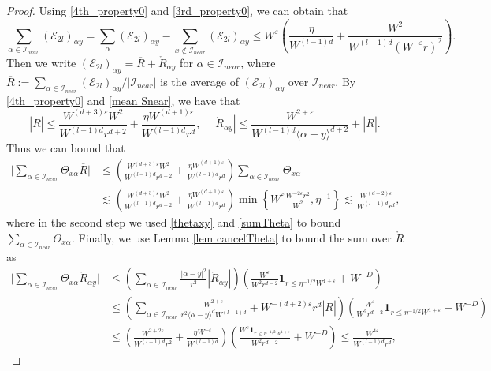 \documentclass{article}
\newcommand{\1}{\mathds{1}}
\numberwithin{equation}{section}
\newcommand{\al}{\alpha}
\newcommand{\be}{\begin{equation}}
\newcommand{\ee}{\end{equation}}
\newcommand{\e}{{\varepsilon}}
\renewcommand{\cal}{\mathcal}
\newcommand{\wt}{\widetilde}
\renewcommand{\leq}{\leqslant}
\renewcommand{\le}{\leq}
\theoremstyle{plain} %
\theoremstyle{remark}
\newcommand{\Selek}{{\mathcal E}}
\begin{document}
\begin{proof}
Using \eqref{4th_property0} and \eqref{3rd_property0}, we can obtain that 
\be\label{mean Snear}\sum_{\al\in \cal I_{near}} (\Selek_{2l})_{\al y}=\sum_\al (\Selek_{2l})_{\al y} - \sum_{x\notin \cal I_{near}} (\Selek_{2l})_{\al y} \le W^\e\left(\frac{\eta}{ W^{(l-1)d} } + \frac{W^2}{W^{(l-1)d} (W^{-\e}r)^{2}}\right).\ee
Then we write $ (\Selek_{2l})_{\al y} = \overline R + \mathring R_{\al y}$ for $\al \in \cal I_{near}$, where $\overline R:= \sum_{\al\in \cal I_{near}}(\Selek_{2l})_{\al y}/|\cal I_{near}|$ is the average of $(\Selek_{2l})_{\al y}$ over $\cal I_{near}$.   
By \eqref{4th_property0} and \eqref{mean Snear}, we have that
\be\label{bound barR} |\overline R| \le \frac{W^{(d+3)\e}W^2}{W^{(l-1)d}r^{d+2}}+\frac{ \eta W^{(d+1)\e}}{W^{(l-1)d}r^d},\quad | \mathring R_{\al y} | \le  \frac{W^{2+\e}}{W^{ (l-1)d}\langle \al-y\rangle^{d+2}} + |\overline R| .\ee
Thus we can bound that 
\begin{align}
\Big| \sum_{\al \in \cal I_{near}}\Theta_{  x \al} \overline R  \Big|&\le \left( \frac{W^{(d+3)\e}W^2}{W^{(l-1)d}r^{d+2}}+\frac{ \eta W^{(d+1)\e}}{W^{(l-1)d}r^d}\right)\sum_{\al\in \cal I_{near}}\Theta_{x\al} \nonumber\\
&\lesssim   \left( \frac{W^{(d+3)\e}W^2}{W^{(l-1)d}r^{d+2}}+\frac{ \eta W^{(d+1)\e}}{W^{(l-1)d}r^d}\right) \min\left\{W^\e\frac{W^{-2\e}r^2}{W^2},\eta^{-1}\right\} \lesssim  \frac{W^{(d+2)\e}}{W^{(l-1)d} r^{d}},\label{Rnear_sum1}
\end{align}
where in the second step we used \eqref{thetaxy} and \eqref{sumTheta} to bound $\sum_{\al\in \cal I_{near}}\Theta_{x\al} .$
Finally, we use Lemma \ref{lem cancelTheta} to bound the sum over $\mathring R$ as %
\begin{align}
\Big| \sum_{\al\in \cal I_{near}}\Theta_{ x \al} \mathring R_{\al y} \Big|& \le  \left(\sum_{\al\in \cal I_{near}}\frac{|\al-y|^2}{r^2}|\mathring R_{\al y}|\right) \left(  \frac{W^\e}{W^2r^{d-2}}\mathbf 1_{r\le   \eta^{-1/2}W^{1+\e}}   + W^{-D}\right) \nonumber\\
 & \le \left(\sum_{\al\in \cal I_{near}}\frac{W^{2+\e}}{r^2\langle\al-y\rangle^d W^{(l-1)d}} + W^{-(d+2)\e} r^d |\overline R|\right) \left(  \frac{W^\e}{W^2r^{d-2}}\mathbf 1_{r\le   \eta^{-1/2}W^{1+\e}}   + W^{-D}\right)\nonumber\\
& \le \left(\frac{W^{2+2\e}}{W^{(l-1)d}r^2 } + \frac{\eta W^{-\e}}{W^{(l-1)d}}\right) \left( \frac{W^\e \mathbf 1_{r\le   \eta^{-1/2}W^{1+\e}}}{W^2r^{d-2}}   + W^{-D}\right)\le \frac{W^{4\e}}{W^{(l-1)d} r^{d}},\label{Rnear_sum2}

\end{align}
\end{proof}
\end{document}
